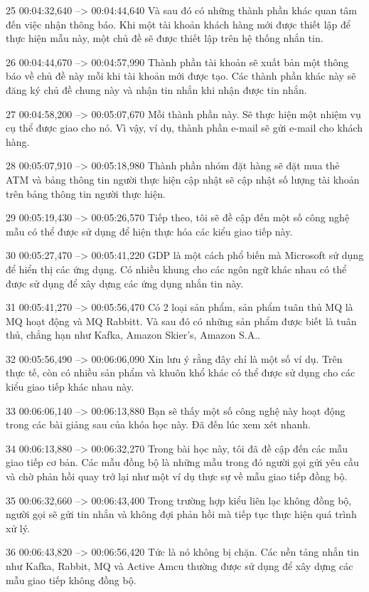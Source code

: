 25
00:04:32,640 --> 00:04:44,640
Và sau đó có những thành phần khác quan tâm đến việc nhận thông báo.  Khi một tài khoản khách hàng mới được thiết lập để thực hiện mẫu này, một chủ đề sẽ được thiết lập trên hệ thống nhắn tin.

26
00:04:44,670 --> 00:04:57,990
Thành phần tài khoản sẽ xuất bản một thông báo về chủ đề này mỗi khi tài khoản mới được tạo.  Các thành phần khác này sẽ đăng ký chủ đề chung này và nhận tin nhắn khi nhận được tin nhắn.

27
00:04:58,200 --> 00:05:07,670
Mỗi thành phần này.  Sẽ thực hiện một nhiệm vụ cụ thể được giao cho nó.  Vì vậy, ví dụ, thành phần e-mail sẽ gửi e-mail cho khách hàng.

28
00:05:07,910 --> 00:05:18,980
Thành phần nhóm đặt hàng sẽ đặt mua thẻ ATM và bảng thông tin người thực hiện cập nhật sẽ cập nhật số lượng tài khoản trên bảng thông tin người thực hiện.

29
00:05:19,430 --> 00:05:26,570
Tiếp theo, tôi sẽ đề cập đến một số công nghệ mẫu có thể được sử dụng để hiện thực hóa các kiểu giao tiếp này.

30
00:05:27,470 --> 00:05:41,220
GDP là một cách phổ biến mà Microsoft sử dụng để hiển thị các ứng dụng.  Có nhiều khung cho các ngôn ngữ khác nhau có thể được sử dụng để xây dựng các ứng dụng nhắn tin này.

31
00:05:41,270 --> 00:05:56,470
Có 2 loại sản phẩm, sản phẩm tuân thủ MQ là MQ hoạt động và MQ Rabbitt.  Và sau đó có những sản phẩm được biết là tuân thủ, chẳng hạn như Kafka, Amazon Skier's, Amazon S.A..

32
00:05:56,490 --> 00:06:06,090
Xin lưu ý rằng đây chỉ là một số ví dụ.  Trên thực tế, còn có nhiều sản phẩm và khuôn khổ khác có thể được sử dụng cho các kiểu giao tiếp khác nhau này.

33
00:06:06,140 --> 00:06:13,880
Bạn sẽ thấy một số công nghệ này hoạt động trong các bài giảng sau của khóa học này.  Đã đến lúc xem xét nhanh.

34
00:06:13,880 --> 00:06:32,270
Trong bài học này, tôi đã đề cập đến các mẫu giao tiếp cơ bản.  Các mẫu đồng bộ là những mẫu trong đó người gọi gửi yêu cầu và chờ phản hồi quay trở lại như một ví dụ thực sự về mẫu giao tiếp đồng bộ.

35
00:06:32,660 --> 00:06:43,400
Trong trường hợp kiểu liên lạc không đồng bộ, người gọi sẽ gửi tin nhắn và không đợi phản hồi mà tiếp tục thực hiện quá trình xử lý.

36
00:06:43,820 --> 00:06:56,420
Tức là nó không bị chặn.  Các nền tảng nhắn tin như Kafka, Rabbit, MQ và Active Amcu thường được sử dụng để xây dựng các mẫu giao tiếp không đồng bộ.

